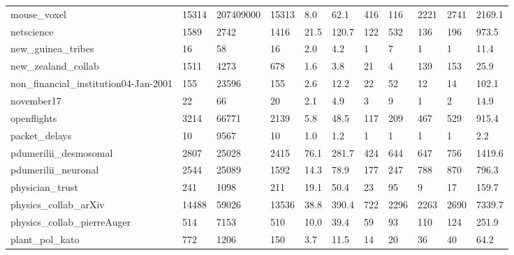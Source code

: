 \begin{longtable}{lllllllllll}
 mouse\_voxel                                        & 15314      & 207409000 & 15313 & 8.0    & 62.1   & 416   & 116    & 2221   & 2741   & 2169.1  \\
 netscience                                         & 1589       & 2742      & 1416  & 21.5   & 120.7  & 122   & 532    & 136    & 196    & 973.5   \\
 new\_guinea\_tribes                                  & 16         & 58        & 16    & 2.0    & 4.2    & 1     & 7      & 1      & 1      & 11.4    \\
 new\_zealand\_collab                                 & 1511       & 4273      & 678   & 1.6    & 3.8    & 21    & 4      & 139    & 153    & 25.9    \\
 non\_financial\_institution04-Jan-2001               & 155        & 23596     & 155   & 2.6    & 12.2   & 22    & 52     & 12     & 14     & 102.1   \\
 november17                                         & 22         & 66        & 20    & 2.1    & 4.9    & 3     & 9      & 1      & 2      & 14.9    \\
 openflights                                        & 3214       & 66771     & 2139  & 5.8    & 48.5   & 117   & 209    & 467    & 529    & 915.4   \\
 packet\_delays                                      & 10         & 9567      & 10    & 1.0    & 1.2    & 1     & 1      & 1      & 1      & 2.2     \\
 pdumerilii\_desmosomal                              & 2807       & 25028     & 2415  & 76.1   & 281.7  & 424   & 644    & 647    & 756    & 1419.6  \\
 pdumerilii\_neuronal                                & 2544       & 25089     & 1592  & 14.3   & 78.9   & 177   & 247    & 788    & 870    & 796.3   \\
 physician\_trust                                    & 241        & 1098      & 211   & 19.1   & 50.4   & 23    & 95     & 9      & 17     & 159.7   \\
 physics\_collab\_arXiv                               & 14488      & 59026     & 13536 & 38.8   & 390.4  & 722   & 2296   & 2263   & 2690   & 7339.7  \\
 physics\_collab\_pierreAuger                         & 514        & 7153      & 510   & 10.0   & 39.4   & 59    & 93     & 110    & 124    & 251.9   \\
 plant\_pol\_kato                                     & 772        & 1206      & 150   & 3.7    & 11.5   & 14    & 20     & 36     & 40     & 64.2    \\

\end{longtable}
